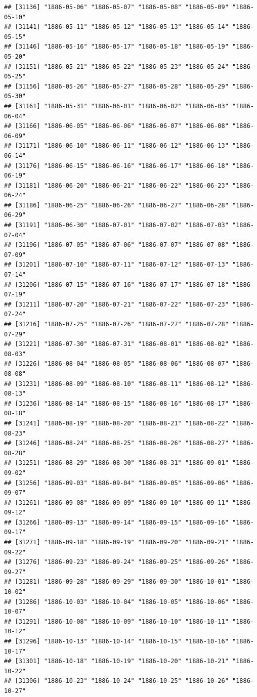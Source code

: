 \documentclass{article}\usepackage[]{graphicx}\usepackage[]{color}
\makeatletter
\newenvironment{kframe}{%
 \def\at@end@of@kframe{}%
 \ifinner\ifhmode%
  \def\at@end@of@kframe{\end{minipage}}%
  \begin{minipage}{\columnwidth}%
 \fi\fi%
 \def\FrameCommand##1{\hskip\@totalleftmargin \hskip-\fboxsep
 \colorbox{shadecolor}{##1}\hskip-\fboxsep
     \hskip-\linewidth \hskip-\@totalleftmargin \hskip\columnwidth}%
 \MakeFramed {\advance\hsize-\width
   \@totalleftmargin\z@ \linewidth\hsize
   \@setminipage}}%
 {\par\unskip\endMakeFramed%
 \at@end@of@kframe}
\newenvironment{knitrout}{}{} %
\makeatother
\begin{document}
\begin{description}
\begin{knitrout}
\begin{kframe}
\begin{verbatim}
## [31136] "1886-05-06" "1886-05-07" "1886-05-08" "1886-05-09" "1886-05-10"
## [31141] "1886-05-11" "1886-05-12" "1886-05-13" "1886-05-14" "1886-05-15"
## [31146] "1886-05-16" "1886-05-17" "1886-05-18" "1886-05-19" "1886-05-20"
## [31151] "1886-05-21" "1886-05-22" "1886-05-23" "1886-05-24" "1886-05-25"
## [31156] "1886-05-26" "1886-05-27" "1886-05-28" "1886-05-29" "1886-05-30"
## [31161] "1886-05-31" "1886-06-01" "1886-06-02" "1886-06-03" "1886-06-04"
## [31166] "1886-06-05" "1886-06-06" "1886-06-07" "1886-06-08" "1886-06-09"
## [31171] "1886-06-10" "1886-06-11" "1886-06-12" "1886-06-13" "1886-06-14"
## [31176] "1886-06-15" "1886-06-16" "1886-06-17" "1886-06-18" "1886-06-19"
## [31181] "1886-06-20" "1886-06-21" "1886-06-22" "1886-06-23" "1886-06-24"
## [31186] "1886-06-25" "1886-06-26" "1886-06-27" "1886-06-28" "1886-06-29"
## [31191] "1886-06-30" "1886-07-01" "1886-07-02" "1886-07-03" "1886-07-04"
## [31196] "1886-07-05" "1886-07-06" "1886-07-07" "1886-07-08" "1886-07-09"
## [31201] "1886-07-10" "1886-07-11" "1886-07-12" "1886-07-13" "1886-07-14"
## [31206] "1886-07-15" "1886-07-16" "1886-07-17" "1886-07-18" "1886-07-19"
## [31211] "1886-07-20" "1886-07-21" "1886-07-22" "1886-07-23" "1886-07-24"
## [31216] "1886-07-25" "1886-07-26" "1886-07-27" "1886-07-28" "1886-07-29"
## [31221] "1886-07-30" "1886-07-31" "1886-08-01" "1886-08-02" "1886-08-03"
## [31226] "1886-08-04" "1886-08-05" "1886-08-06" "1886-08-07" "1886-08-08"
## [31231] "1886-08-09" "1886-08-10" "1886-08-11" "1886-08-12" "1886-08-13"
## [31236] "1886-08-14" "1886-08-15" "1886-08-16" "1886-08-17" "1886-08-18"
## [31241] "1886-08-19" "1886-08-20" "1886-08-21" "1886-08-22" "1886-08-23"
## [31246] "1886-08-24" "1886-08-25" "1886-08-26" "1886-08-27" "1886-08-28"
## [31251] "1886-08-29" "1886-08-30" "1886-08-31" "1886-09-01" "1886-09-02"
## [31256] "1886-09-03" "1886-09-04" "1886-09-05" "1886-09-06" "1886-09-07"
## [31261] "1886-09-08" "1886-09-09" "1886-09-10" "1886-09-11" "1886-09-12"
## [31266] "1886-09-13" "1886-09-14" "1886-09-15" "1886-09-16" "1886-09-17"
## [31271] "1886-09-18" "1886-09-19" "1886-09-20" "1886-09-21" "1886-09-22"
## [31276] "1886-09-23" "1886-09-24" "1886-09-25" "1886-09-26" "1886-09-27"
## [31281] "1886-09-28" "1886-09-29" "1886-09-30" "1886-10-01" "1886-10-02"
## [31286] "1886-10-03" "1886-10-04" "1886-10-05" "1886-10-06" "1886-10-07"
## [31291] "1886-10-08" "1886-10-09" "1886-10-10" "1886-10-11" "1886-10-12"
## [31296] "1886-10-13" "1886-10-14" "1886-10-15" "1886-10-16" "1886-10-17"
## [31301] "1886-10-18" "1886-10-19" "1886-10-20" "1886-10-21" "1886-10-22"
## [31306] "1886-10-23" "1886-10-24" "1886-10-25" "1886-10-26" "1886-10-27"

\end{verbatim}
\end{kframe}
\end{knitrout}
\end{description}
\end{document}
